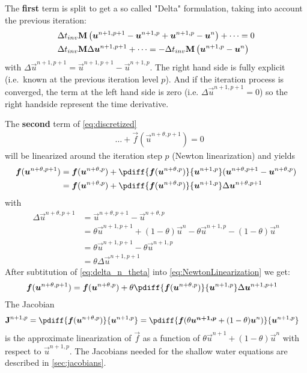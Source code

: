 The \textbf{first} term is split to get a so called "Delta" formulation, taking into account the previous iteration:
\begin{align}
    &\Delta t_{inv} \mbox{\boldmath ${\rm M}$} \left( \mbox{\boldmath $u$}^{n+1,p+1} - \mbox{\boldmath $u$}^{n+1,p} + \mbox{\boldmath $u$}^{n+1,p} - \mbox{\boldmath $u$}^{n} \right) + \dots = 0
    \\
    & \Delta t_{inv} \mbox{\boldmath ${\rm M}$} \Delta \mbox{\boldmath $u$}^{n+1,p+1} + \dots  =
    - \Delta t_{inv} \mbox{\boldmath ${\rm M}$} \left( \mbox{\boldmath $u$}^{n+1,p} - \mbox{\boldmath $u$}^{n} \right)
\end{align}
with $\Delta \vec{u}^{n+1,p+1} = \vec{u}^{n+1,p+1} - \vec{u}^{n+1,p}$.
The right hand side is fully explicit (i.e.\ known at the previous iteration level $p$).
And if the iteration process is converged, the term at the left hand side is zero (i.e. $\Delta \vec{u}^{n+1,p+1} = 0$) so the right handside represent the time derivative.

The \textbf{second} term of \autoref{eq:discretized}
\begin{align}
    &\ldots +
    \vec{f} \left( \vec{u}^{n+\theta, p+1} \right) = 0
    \label{eq:second_term}
\end{align}
%
will be linearized around the iteration step $p$ (Newton linearization) and yields
\begin{align}
    \vec{f}( \vec{u}^{n+\theta, p+1} ) & = \vec{f}( \vec{u}^{n+\theta, p} ) + \pdiff{\vec{f}(\vec{u}^{n+\theta,p})}{\vec{u}^{n+1,p}} (\vec{u}^{n+\theta,p+1} - \vec{u}^{n+\theta,p})
    \\
    & = \vec{f}( \vec{u}^{n+\theta, p} ) + \pdiff{\vec{f}(\vec{u}^{n+\theta,p})}{\vec{u}^{n+1,p}} \Delta\vec{u}^{n+\theta,p+1} \label{eq:NewtonLinearization}
\end{align}
with
\begin{align}
    \Delta \vec{u}^{n+\theta, p+1} & = \vec{u}^{n+\theta, p+1} - \vec{u}^{n+\theta, p}
    \\
    & = \theta \vec{u}^{n+1, p+1} + (1-\theta) \vec{u}^{n} - \theta \vec{u}^{n+1, p} - (1-\theta) \vec{u}^{n}
    \\
    & = \theta \vec{u}^{n+1, p+1} - \theta \vec{u}^{n+1, p}
    \\
    &= \theta \Delta \vec{u}^{n+1, p+1} \label{eq:delta_n_theta}
\end{align}
After subtitution of \autoref{eq:delta_n_theta} into \autoref{eq:NewtonLinearization} we get:
\begin{align}
    \vec{f}( \vec{u}^{n+\theta, p+1} ) & = \vec{f}( \vec{u}^{n+\theta, p} ) + \theta \pdiff{\vec{f}(\vec{u}^{n+\theta,p})}{\vec{u}^{n+1,p}} \Delta \vec{u}^{n+1, p+1}
\end{align}
The Jacobian
\begin{align}
    \mat{J}^{n+1,p} & = \pdiff{\vec{f}(\vec{u}^{n+\theta,p})}{\vec{u}^{n+1,p}}
     = \pdiff{\vec{f}(\theta \vec{u^{n+1,p}} + (1 - \theta) \vec{u}^{n})}{\vec{u}^{n+1,p}}
\end{align}
is the approximate linearization of $\vec{f}$ as a
function of $\theta \vec{u}^{n+1} + (1-\theta)\vec{u}^{n}$ with respect to $\vec{u}^{n+1, p}$.
The Jacobians needed for the shallow water equations are described in \autoref{sec:jacobians}.


